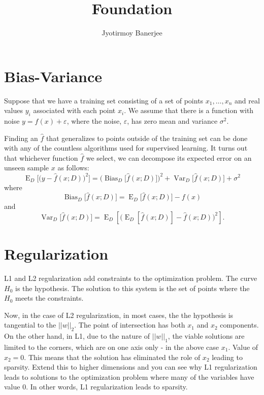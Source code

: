 \documentclass{article}
\title{Foundation}
\author{Jyotirmoy Banerjee}
\begin{document}
\maketitle


\section{Bias-Variance}
Suppose that we have a training set consisting of a set of points $x_{1},\dots ,x_{n}$ and real values $y_{i}$ associated with each point $x_{i}$. We assume that there is a function with noise $y=f(x)+\varepsilon$, where the noise, $\varepsilon$, has zero mean and variance $\sigma^{2}$.

Finding an $\hat{f}$ that generalizes to points outside of the training set can be done with any of the countless algorithms used for supervised learning. It turns out that whichever function $\hat{f}$ we select, we can decompose its expected error on an unseen sample $x$ as follows:
\[ \operatorname {E} _{D}{\Big [}{\big (}y-{\hat {f}}(x;D){\big )}^{2}{\Big ]}={\Big (}\operatorname {Bias} _{D}{\big [}{\hat {f}}(x;D){\big ]}{\Big )}^{2}+\operatorname {Var} _{D}{\big [}{\hat {f}}(x;D){\big ]}+\sigma ^{2} \]
where
\[ \operatorname {Bias} _{D}{\big [}{\hat {f}}(x;D){\big ]}=\operatorname {E} _{D}{\big [}{\hat {f}}(x;D){\big ]}-f(x) \]
and
\[ \operatorname {Var} _{D}{\big [}{\hat {f}}(x;D){\big ]}=\operatorname {E} _{D}[{\big (}\operatorname {E} _{D}[{\hat {f}}(x;D)]-{\hat {f}}(x;D){\big )}^{2}]. \]


\section{Regularization}
L1 and L2 regularization add constraints to the optimization problem. The curve $H_0$ is the hypothesis. The solution to this system is the set of points where the $H_0$ meets the constraints.

Now, in the case of L2 regularization, in most cases, the the hypothesis is tangential to the $||w||_2$. The point of intersection has both $x_1$ and $x_2$ components. On the other hand, in L1, due to the nature of $||w||_1$, the viable solutions are limited to the corners, which are on one axis only - in the above case $x_1$. Value of $x_2 = 0$. This means that the solution has eliminated the role of $x_2$ leading to sparsity. Extend this to higher dimensions and you can see why L1 regularization leads to solutions to the optimization problem where many of the variables have value $0$.
In other words, L1 regularization leads to sparsity.
\end{document}
